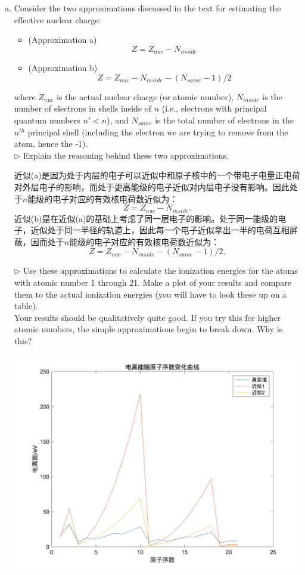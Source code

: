 \documentclass[reqno,a4paper,12pt]{amsart}
\begin{document}
\begin{enumerate}[(a)]
	\item Consider the two approximations discussed in the text for estimating the effective nuclear charge: 
	\begin{itemize}
		\item (Approximation a) 
		\[
			Z = Z_{nuc} - N_{inside}
		\]
		\item (Approximation b)
		\[
			Z = Z_{nuc} - N_{inside} - (N_{same}-1)/2
		\]
	\end{itemize}
	where $Z_{nuc}$ is the actual nuclear charge (or atomic number), $N_{inside}$ is the number of electrons in shells inside of $n$ (i.e., electrons with principal quantum numbers $n'<n$), and $N_{same}$ is the total number of electrons in the $n^{th}$ principal shell (including the electron we are trying to remove from the atom, hence the -1). \\
	$\triangleright$ Explain the reasoning behind these two approximations. 
	\begin{tcolorbox}[breakable, colback = black!5!white, colframe = black]
	近似(a)是因为处于内层的电子可以近似中和原子核中的一个带电子电量正电荷对外层电子的影响，而处于更高能级的电子近似对内层电子没有影响。因此处于$n$能级的电子对应的有效核电荷数近似为：
	\[
		Z = Z_{nuc} - N_{inside}.
	\]
	近似(b)是在近似(a)的基础上考虑了同一层电子的影响。处于同一能级的电子，近似处于同一半径的轨道上，因此每一个电子近似拿出一半的电荷互相屏蔽，因而处于$n$能级的电子对应的有效核电荷数近似为：
	\[
		Z = Z_{nuc} - N_{inside} - (N_{same} - 1)/2.
	\]
	\end{tcolorbox}
	$\triangleright$ Use these approximations to calculate the ionization energies for the atoms with atomic number 1 through 21. Make a plot of your results and compare them to the actual ionization energies (you will have to look these up on a table). \\
	Your results should be qualitatively quite good. If you try this for higher atomic numbers, the simple approximations begin to break down. Why is this?
	\begin{tcolorbox}[breakable, colback = black!5!white, colframe = black]
	\includegraphics[scale = 0.35]{ionization.png}\\

\end{tcolorbox}
\end{enumerate}
\end{document}
